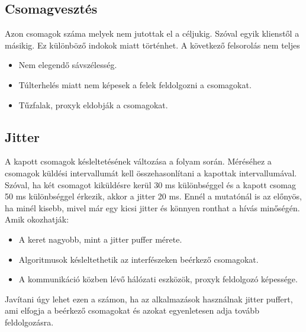 \subsection{Csomagvesztés}

Azon csomagok száma melyek nem jutottak el a céljukig. Szóval egyik klienstől a másikig. Ez különböző
indokok miatt történhet. A következő felsorolás nem teljes \cite{measure}

\begin{itemize}
	\item Nem elegendő sávszélesség. 
	\item Túlterhelés miatt nem képesek a felek feldolgozni a csomagokat.
	\item Tűzfalak, proxyk eldobják a csomagokat. 
\end{itemize}

\subsection{Jitter}

A kapott csomagok késleltetésének változása a folyam során. Méréséhez a csomagok küldési intervallumát
kell összehasonlítani a kapottak intervallumával. Szóval, ha két csomagot kiküldésre kerül 30 ms 
különbséggel és a kapott csomag 50 ms különbséggel érkezik, akkor a jitter 20 ms. Ennél a mutatónál is
az előnyös, ha minél kisebb, mivel már egy kicsi jitter és könnyen ronthat a hívás minőségén. 
Amik okozhatják:

\begin{itemize}
	\item A keret nagyobb, mint a jitter puffer mérete. 
	\item Algoritmusok késleltethetik az interfészeken beérkező csomagokat. 
	\item A kommunikáció közben lévő hálózati eszközök, proxyk feldolgozó képessége. 
\end{itemize}

Javítani úgy lehet ezen a számon, ha az alkalmazások használnak jitter puffert, ami elfogja a
beérkező csomagokat és azokat egyenletesen adja tovább feldolgozásra. 